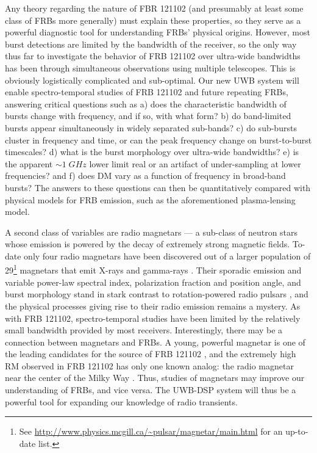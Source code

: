 \documentclass[10pt]{myNSF}
\begin{document}
Any theory regarding the nature of FBR 121102 (and presumably at least
some class of FRBs more generally) must explain these properties, so
they serve as a powerful diagnostic tool for understanding FRBs'
physical origins.  However, most burst detections are limited by the
bandwidth of the receiver, so the only way thus far to investigate the
behavior of FRB 121102 over ultra-wide bandwidths has been through
simultaneous observations using multiple telescopes.  This is
obviously logistically complicated and sub-optimal.  Our new UWB
system will enable spectro-temporal studies of FRB 121102 and future
repeating FRBs, answering critical questions such as a) does the
characteristic bandwidth of bursts change with frequency, and if so,
with what form? b) do band-limited bursts appear simultaneously in
widely separated sub-bands? c) do sub-bursts cluster in frequency and
time, or can the peak frequency change on burst-to-burst timescales?
d) what is the burst morphology over ultra-wide bandwidths? e) is the
apparent $\sim 1\; GHz$ lower limit real or an artifact of
under-sampling at lower frequencies? and f) does DM vary as a function
of frequency in broad-band bursts?  The answers to these questions can
then be quantitatively compared with physical models for FRB emission,
such as the aforementioned plasma-lensing model.

A second class of variables are radio magnetars --- a sub-class of
neutron stars whose emission is powered by the decay of extremely
strong magnetic fields.  To-date only four radio magnetars have been
discovered out of a larger population of 29\footnote{See
  \url{http://www.physics.mcgill.ca/~pulsar/magnetar/main.html} for an
  up-to-date list.} magnetars that emit X-rays and gamma-rays
\citep{crh+06,crh+07,lbb+10,efk+13}.  Their sporadic emission and
variable power-law spectral index, polarization fraction and position
angle, and burst morphology stand in stark contrast to
rotation-powered radio pulsars \citep[e.g.][]{crp+07}, and the
physical processes giving rise to their radio emission remains a
mystery.  As with FRB 121102, spectro-temporal studies have been
limited by the relatively small bandwidth provided by most receivers.
Interestingly, there may be a connection between magnetars and FRBs.
A young, powerful magnetar is one of the leading candidates for the
source of FRB 121102 \citep[e.g.][]{mm18}, and the extremely high RM
observed in FRB 121102 has only one known analog: the radio magnetar
near the center of the Milky Way \citep{efk+13}.  Thus, studies of
magnetars may improve our understanding of FRBs, and vice versa.  The
UWB-DSP system will thus be a powerful tool for expanding our
knowledge of radio transients.
\end{document}
